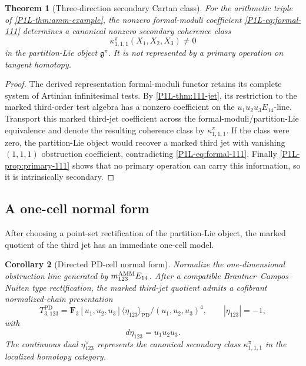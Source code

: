 \documentclass[11pt]{article}
\newtheorem{theorem}{Theorem}[section]
\newtheorem{corollary}[theorem]{Corollary}
\theoremstyle{remark}
\newcommand{\F}{\mathbf F}
\providecommand{\PD}{\mathrm{PD}}
\begin{document}
\begin{theorem}[Three-direction secondary Cartan class]\label{P1L-thm:secondary-111}
For the arithmetic triple of \cref{P1L-thm:amm-example}, the nonzero formal-moduli coefficient \eqref{P1L-eq:formal-111} determines a canonical nonzero secondary coherence class
\[
 \kappa^\pi_{1,1,1}(X_1,X_2,X_3)\neq0
\]
in the partition-Lie object \(\mathfrak g^\pi\).  It is not represented by a primary operation on tangent homotopy.
\end{theorem}

\begin{proof}
The derived representation formal-moduli functor retains its complete system of Artinian infinitesimal tests.  By \cref{P1L-thm:111-jet}, its restriction to the marked third-order test algebra has a nonzero coefficient on the \(u_1u_2u_3E_{14}\)-line.  Transport this marked third-jet coefficient across the formal-moduli/partition-Lie equivalence and denote the resulting coherence class by \(\kappa^\pi_{1,1,1}\).  If the class were zero, the partition-Lie object would recover a marked third jet with vanishing \((1,1,1)\) obstruction coefficient, contradicting \eqref{P1L-eq:formal-111}.  Finally \cref{P1L-prop:primary-111} shows that no primary operation can carry this information, so it is intrinsically secondary.
\end{proof}

\subsection{A one-cell normal form}

After choosing a point-set rectification of the partition-Lie object, the marked quotient of the third jet has an immediate one-cell model.

\begin{corollary}[Directed PD-cell normal form]\label{P1L-cor:pd-cell}
Normalize the one-dimensional obstruction line generated by \(m_{123}^{\rm AMM}E_{14}\).  After a compatible Brantner--Campos--Nuiten type rectification, the marked third-jet quotient admits a cofibrant normalized-chain presentation
\[
 T^{\PD}_{3,123}
 =
 \F_3[u_1,u_2,u_3]\langle\eta_{123}\rangle_{\PD}/(u_1,u_2,u_3)^4,
 \qquad
 |\eta_{123}|=-1,
\]
with
\begin{equation}\label{P1L-eq:pd-cell}
 d\eta_{123}=u_1u_2u_3.
\end{equation}
The continuous dual \(\eta_{123}^\vee\) represents the canonical secondary class \(\kappa^\pi_{1,1,1}\) in the localized homotopy category.
\end{corollary}
\end{document}

